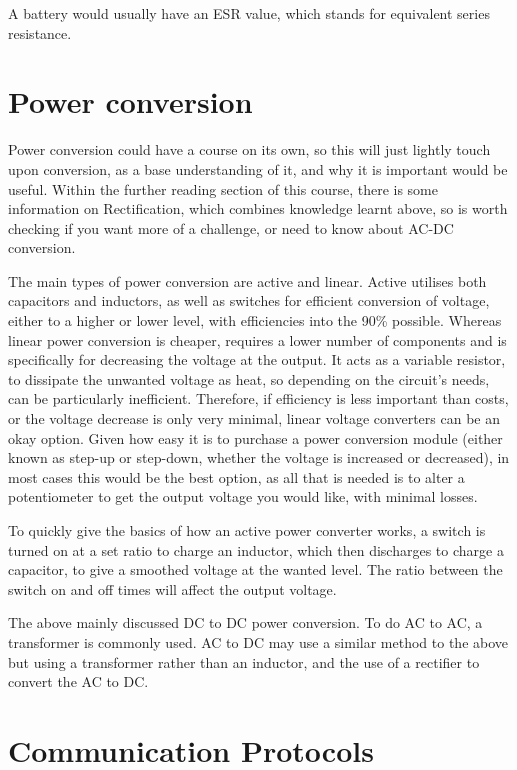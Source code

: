 \documentclass[a4paper,11pt]{report}
\begin{document}
A battery would usually have an ESR value, which stands for equivalent series resistance.

\section{Power conversion}

Power conversion could have a course on its own, so this will just lightly touch upon conversion, as a base understanding of it, and why it is important would be useful. Within the further reading section of this course, there is some information on Rectification, which combines knowledge learnt above, so is worth checking if you want more of a challenge, or need to know about AC-DC conversion.

The main types of power conversion are active and linear. Active utilises both capacitors and inductors, as well as switches for efficient conversion of voltage, either to a higher or lower level, with efficiencies into the 90\% possible. Whereas linear power conversion is cheaper, requires a lower number of components and is specifically for decreasing the voltage at the output. It acts as a variable resistor, to dissipate the unwanted voltage as heat, so depending on the circuit's needs, can be particularly inefficient. Therefore, if efficiency is less important than costs, or the voltage decrease is only very minimal, linear voltage converters can be an okay option. Given how easy it is to purchase a power conversion module (either known as step-up or step-down, whether the voltage is increased or decreased), in most cases this would be the best option, as all that is needed is to alter a potentiometer to get the output voltage you would like, with minimal losses.

To quickly give the basics of how an active power converter works, a switch is turned on at a set ratio to charge an inductor, which then discharges to charge a capacitor, to give a smoothed voltage at the wanted level. The ratio between the switch on and off times will affect the output voltage.

The above mainly discussed DC to DC power conversion. To do AC to AC, a transformer is commonly used. AC to DC may use a similar method to the above but using a transformer rather than an inductor, and the use of a rectifier to convert the AC to DC.

\section{Communication Protocols}
\end{document}
